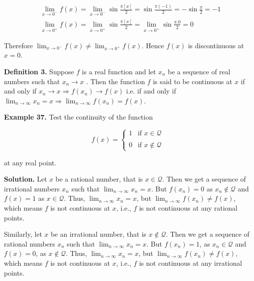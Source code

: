 \documentclass[../../main.tex]{subfiles}
\begin{document}
\begin{align*}
    &\lim_{x\rightarrow 0^-}{f(x)} = \lim_{x\rightarrow 0^-}{\sin\frac{\pi[x]}{2}} = \sin\frac{\pi(-1)}{2} = -\sin \frac{\pi}{2} = -1 \\    
    & \lim_{x\rightarrow 0^+}f(x) = \lim_{x\rightarrow 0^+}\sin\frac{\pi[x]}{2} = \lim_{x\to0^+}\sin\frac{\pi.0}{2} = 0
\end{align*}

Therefore $\lim_{x\rightarrow 0^-}{f(x)} \neq \lim_{x\rightarrow 0^+}{f(x)}$. Hence $f(x)$ is discontinuous at $x=0$.

\vspace{0.3cm}
\textbf{Definition 3.} Suppose $f$ is a real function and let {$x_n$} be a sequence of real numbers such that $x_n\rightarrow x$ . Then the function $f$ is said to be continuous at $x$ if and only if $x_n\rightarrow x \Rightarrow f(x_n)\rightarrow f(x)$ i.e. if and only if  $\lim_{n\rightarrow \infty} {x_n} = x \Rightarrow \lim_{n\rightarrow \infty} {f(x_n)} = f(x)$.

\vspace{0.2cm}
\textbf{Example 37.} Test the continuity of the function 

\begin{equation*}
    f(x) =
\begin{cases}
    1     & \text{if    }      x \in \mathcal{Q} \\\\
    0   & \text{if    }        x \notin \mathcal{Q}
\end{cases}
\end{equation*}

at any real point.

\textbf{Solution.} Let $x$ be a rational number, that is $x\in \mathcal{Q}$. Then we get a sequence of irrational numbers ${x_n}$ such that $\lim_{n\rightarrow \infty} {x_n} = x$. But $f({x_n})= 0$ as ${x_n}\notin \mathcal{Q}$ and $f(x)=1$ as $x\in \mathcal{Q}$. Thus, $\lim_{n\rightarrow \infty} {x_n} = x$, but $\lim_{n\rightarrow \infty} {f(x_n)} \neq f(x)$, which means $f$ is not continuous at $x$, i.e., $f$ is not continuous at any rational points.

Similarly, let $x$ be an irrational number, that is $x \notin \mathcal{Q}$. Then we get a sequence of rational numbers ${x_n}$ such that $\lim_{n\rightarrow \infty} {x_n} = x$. But $f({x_n})= 1$, as ${x_n}\in \mathcal{Q}$ and $f(x)=0$, as $x \notin \mathcal{Q}$. Thus, $\lim_{n\rightarrow \infty} {x_n} = x$, but $\lim_{n\rightarrow \infty} {f(x_n)} \neq f(x)$, which means $f$ is not continuous at $x$, i.e., $f$ is not continuous at any irrational points. 
\end{document}
